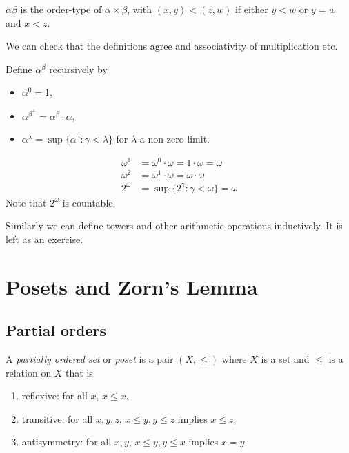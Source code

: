 \documentclass[a4paper]{article}
\begin{document}
\begin{definition}
  \(\alpha\beta\) is the order-type of \(\alpha \times \beta\), with \((x, y) < (z, w)\) if either \(y < w\) or \(y = w\) and \(x < z\).
\end{definition}

We can check that the definitions agree and associativity of multiplication etc.

\begin{definition}
  Define \(\alpha^\beta\) recursively by
  \begin{itemize}
  \item \(\alpha^0 = 1\),
  \item \(\alpha^{\beta^+} = \alpha^\beta \cdot \alpha\),
  \item \(\alpha^\lambda = \sup\{\alpha^\gamma: \gamma < \lambda\}\) for \(\lambda\) a non-zero limit.
  \end{itemize}
\end{definition}

\begin{eg}
  \begin{align*}
    \omega^1 &= \omega^0 \cdot \omega = 1 \cdot \omega = \omega \\
    \omega^2 &= \omega^1 \cdot \omega = \omega \cdot \omega \\
    2^\omega &= \sup\{2^\gamma: \gamma < \omega\} = \omega
  \end{align*}
  Note that \(2^\omega\) is countable.
\end{eg}

Similarly we can define towers and other arithmetic operations inductively. It is left as an exercise.

\section{Posets and Zorn's Lemma}

\subsection{Partial orders}

\begin{definition}[Poset]
  A \emph{partially ordered set} or \emph{poset} is a pair \((X, \leq)\) where \(X\) is a set and \(\leq\) is a relation on \(X\) that is
  \begin{enumerate}
  \item reflexive: for all \(x\), \(x \leq x\),
  \item transitive: for all \(x, y, z\), \(x \leq y, y \leq z\) implies \(x \leq z\),
  \item antisymmetry: for all \(x, y\), \(x \leq y, y \leq x\) implies \(x = y\).
  \end{enumerate}
\end{definition}
\end{document}
